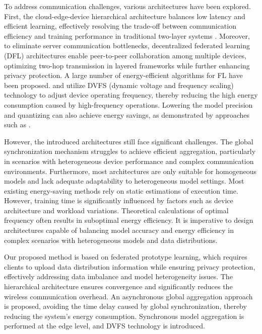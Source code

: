 \documentclass[journal]{IEEEtran}
\begin{document}
To address communication challenges, various architectures have been explored. First, the cloud-edge-device hierarchical architecture \cite{abdellatif2022communication_hierarchical,zhou2023hierarchical} balances low latency and efficient learning, effectively resolving the trade-off between communication efficiency and training performance in traditional two-layer systems \cite{liu_hierarchical_2023}. Moreover, to eliminate server communication bottlenecks, decentralized federated learning (DFL) architectures \cite{kalra2023decentralized,al2023decentralized_D2D} enable peer-to-peer collaboration among multiple devices, optimizing two-hop transmission in layered frameworks while further enhancing privacy protection. A large number of energy-efficient algorithms for FL have been proposed. \cite{rashid2023federated_invasion} and \cite{chen_eefl_2023} utilize DVFS (dynamic voltage and frequency scaling) technology to adjust device operating frequency, thereby reducing the high energy consumption caused by high-frequency operations. Lowering the model precision and quantizing can also achieve energy savings, as demonstrated by approaches such as \cite{de2023hed_quantize,chen2022energy_quantize}. 

However, the introduced architectures still face significant challenges. The global synchronization mechanism struggles to achieve efficient aggregation, particularly in scenarios with heterogeneous device performance and complex communication environments. Furthermore, most architectures \cite{luo2024communication_CEC,wu2023hiflash_CEC} are only suitable for homogeneous models and lack adequate adaptability to heterogeneous model settings. Most existing energy-saving methods rely on static estimations of execution time. However, training time is significantly influenced by factors such as device architecture and workload variations. Theoretical calculations of optimal frequency often results in suboptimal energy efficiency. It is imperative to design architectures capable of balancing model accuracy and energy efficiency in complex scenarios with heterogeneous models and data distributions.

Our proposed method is based on federated prototype learning, which requires clients to upload data distribution information while ensuring privacy protection, effectively addressing data imbalance and model heterogeneity issues. The hierarchical architecture ensures convergence \cite{liu_hierarchical_2023} and significantly reduces the wireless communication overhead. An asynchronous global aggregation approach is proposed, avoiding the time delay caused by global synchronization, thereby reducing the system's energy consumption. Synchronous model aggregation is performed at the edge level, and DVFS technology is introduced. 
\end{document}
